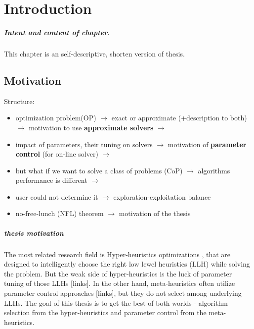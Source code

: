 \chapter{Introduction}\label{intro}
\paragraph{Intent and content of chapter.} This chapter is an self-descriptive, shorten version of thesis.



\section{Motivation}
Structure:
\begin{itemize}
	\item optimization problem(OP) $\rightarrow$ exact or approximate (+description to both) $\rightarrow$ motivation to use \textbf{approximate solvers} $\rightarrow$
	\item impact of parameters, their tuning on solvers $\rightarrow$ motivation of \textbf{parameter control} (for on-line solver) $\rightarrow$
	\item but what if we want to solve a class of problems (CoP) $\rightarrow$ algorithms performance is different $\rightarrow$ 
	\item user could not determine it \cite{kerschke2019automated} $\rightarrow$ exploration-exploitation balance
	\item no-free-lunch (NFL) theorem \cite{wolpert1997no} $\rightarrow$ motivation of the thesis
\end{itemize}

\paragraph{thesis motivation} The most related research field is Hyper-heuristics optimizations \cite{burke2003hyper}, that are designed to intelligently choose the right low lewel heuristics (LLH) while solving the problem.
But the weak side of hyper-heuristics is the luck of parameter tuning of those LLHs [links].
In the other hand, meta-heuristics often utilize parameter control approaches [links], but they do not select among underlying LLHs.
The goal of this thesis is to get the best of both worlds - algorithm selection from the hyper-heuristics and parameter control from the meta-heuristics.


